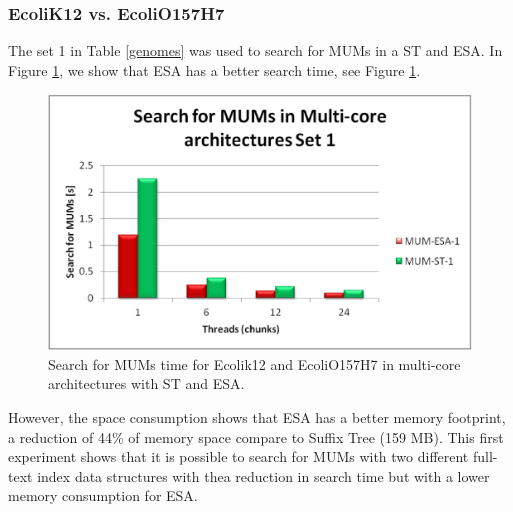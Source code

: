 \documentclass[runningheads,a4paper]{llncs}
\begin{document}
\subsubsection{EcoliK12 vs. EcoliO157H7}
The set 1 in Table \ref{genomes} was used to search for MUMs in a ST and ESA. In Figure \ref{fig:ecoli-mum}, we show that ESA has a better search time, see Figure \ref{fig:ecoli-mum}.
 \begin{figure}[H]
  \centering
  \includegraphics[scale=0.3]{ecoli-MUM.eps}
  \caption{Search for MUMs time for Ecolik12 and EcoliO157H7 in multi-core architectures with ST and ESA.}
  \label{fig:ecoli-mum}
\end{figure}  
However, the space consumption shows that ESA has a better memory footprint, a reduction of 44\% of memory space compare to Suffix Tree (159 MB).
This first experiment shows that it is possible to search for MUMs with two different full-text index data structures with thea reduction in search time but with a lower memory consumption for ESA.
\end{document}
